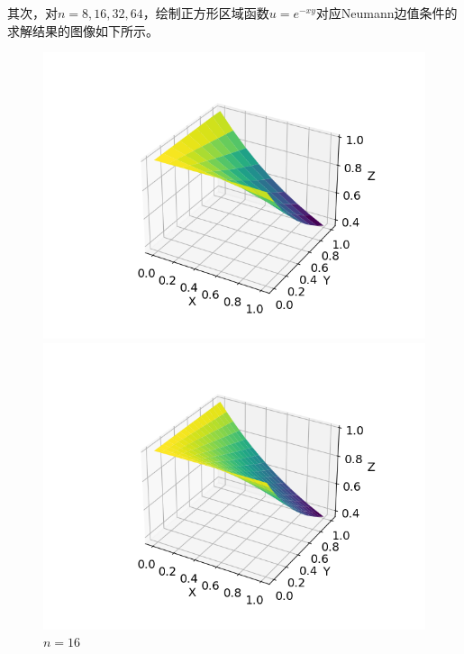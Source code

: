 \documentclass{ctexart}
\begin{document}
\begin{sloppypar}
其次，对$n=8,16,32,64$，绘制正方形区域函数$u = e^{-xy}$对应Neumann边值条件的求解结果的图像如下所示。
\begin{figure}[H]
  \begin{minipage}[t]{0.5\linewidth}
    \centering
    \includegraphics[scale = 0.5]{f2_N_8.png}
    \caption{$n = 8$}
  \end{minipage}
  \begin{minipage}[t]{0.5\linewidth}
    \centering
    \includegraphics[scale = 0.5]{f2_N_16.png}
    \caption{$n = 16$}
  \end{minipage}
  \label{fig2}
\end{figure}


\end{sloppypar}
\end{document}

